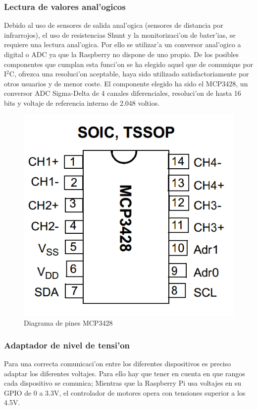 \documentclass[twoside,12pt]{article}
\begin{document}
\subsubsection{Lectura de valores anal'ogicos}
Debido al uso de sensores de salida anal'ogica (sensores de distancia por infrarrojos), el uso de resistencias Shunt y la monitorizaci'on de bater'ias, se requiere una lectura anal'ogica. Por ello se utilizar'a un conversor anal'ogico a digital o ADC ya que la Raspberry no dispone de uno propio. De los posibles componentes que cumplan esta funci'on se ha elegido aquel que de comunique por I$^{2}$C, ofrezca una resoluci'on aceptable, haya sido utilizado satisfactoriamente por otros usuarios y de menor coste. El componente elegido ha sido el MCP3428, un conversor ADC Sigma-Delta de 4 canales diferenciales, resoluci'on de hasta 16 bits y voltaje de referencia interno de 2.048 voltios.

\begin{figure}[ht]
\centering
\includegraphics[scale=0.30]{images/MCP3428_pin_diagram.png}
\caption{Diagrama de pines MCP3428}
\label{fig:LM3914}
\end{figure} 

\subsubsection{Adaptador de nivel de tensi'on}
Para una correcta comunicaci'on entre los diferentes dispositivos es preciso adaptar los diferentes voltajes. Para ello hay que tener en cuenta en que rangos cada dispositivo se comunica; Mientras que la Raspberry Pi usa voltajes en su GPIO de 0 a 3.3V, el controlador de motores opera con tensiones superior a los 4.5V.\\
\end{document}
